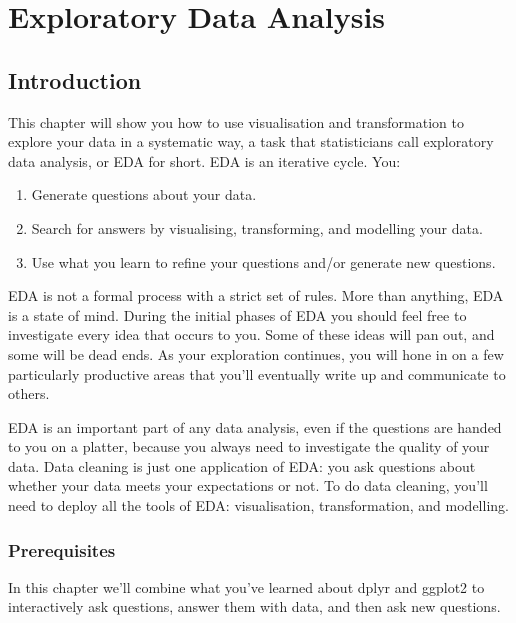 \documentclass[]{book}
\begin{document}
\hypertarget{exploratory-data-analysis}{\chapter{Exploratory Data
Analysis}\label{exploratory-data-analysis}}

\section{Introduction}\label{introduction-3}

This chapter will show you how to use visualisation and transformation
to explore your data in a systematic way, a task that statisticians call
exploratory data analysis, or EDA for short. EDA is an iterative cycle.
You:

\begin{enumerate}
\def\labelenumi{\arabic{enumi}.}
\item
  Generate questions about your data.
\item
  Search for answers by visualising, transforming, and modelling your
  data.
\item
  Use what you learn to refine your questions and/or generate new
  questions.
\end{enumerate}

EDA is not a formal process with a strict set of rules. More than
anything, EDA is a state of mind. During the initial phases of EDA you
should feel free to investigate every idea that occurs to you. Some of
these ideas will pan out, and some will be dead ends. As your
exploration continues, you will hone in on a few particularly productive
areas that you'll eventually write up and communicate to others.

EDA is an important part of any data analysis, even if the questions are
handed to you on a platter, because you always need to investigate the
quality of your data. Data cleaning is just one application of EDA: you
ask questions about whether your data meets your expectations or not. To
do data cleaning, you'll need to deploy all the tools of EDA:
visualisation, transformation, and modelling.

\subsection{Prerequisites}\label{prerequisites-3}

In this chapter we'll combine what you've learned about dplyr and
ggplot2 to interactively ask questions, answer them with data, and then
ask new questions.
\end{document}
